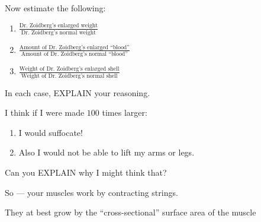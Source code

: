 \documentclass[handout,nooutcomes,noauthor]{ximera}
\begin{document}
\begin{question}
  Now estimate the following:
  \begin{enumerate}
    \item $\frac{\text{Dr.\ Zoidberg's enlarged
        weight}}{\text{Dr.\ Zoidberg's normal weight}}$
    \item $\frac{\text{Amount of Dr.\ Zoidberg's enlarged ``blood''}}{\text{Amount of Dr.\ Zoidberg's normal ``blood''}}$
    \item $\frac{\text{Weight of Dr.\ Zoidberg's enlarged
        shell}}{\text{Weight of Dr.\ Zoidberg's normal shell}}$
  \end{enumerate}
  In each case, EXPLAIN your reasoning.
\end{question}
\mynewpage



\begin{question}
  I think if I were made $100$ times larger:
  \begin{enumerate}
  \item I would suffocate!
  \item Also I would not be able to lift my arms or legs.
  \end{enumerate}
  Can you EXPLAIN why I might think that?

  \begin{freeResponse}
    So --- your muscles work by contracting strings. 

    They at best grow by the ``cross-sectional'' surface area of the muscle 
  \end{freeResponse}
  
\end{question}
\end{document}
